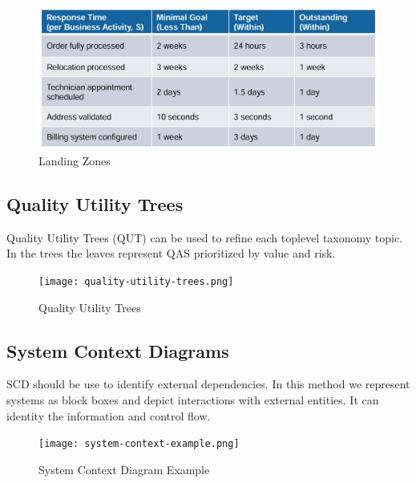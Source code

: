 \documentclass[../Main.tex]{subfiles}
\begin{document}
\begin{figure}[H]
    \centering
    \includegraphics[width=1\linewidth]{Images/landingzone.png}
    \caption{Landing Zones}
\end{figure}

\subsection{Quality Utility Trees}
Quality Utility Trees (QUT) can be used to refine
each toplevel taxonomy topic. In the trees the leaves
represent QAS prioritized by value and risk.

\begin{figure}[H]
    \centering
    \texttt{[image: quality-utility-trees.png]}
    \caption{Quality Utility Trees}
\end{figure}

\subsection{System Context Diagrams}
SCD should be use to identify external dependencies.
In this method we represent systems as block boxes and
depict interactions with external entities.
It can identity the information and control flow.

\begin{figure}[H]
    \centering
    \texttt{[image: system-context-example.png]}
    \caption{System Context Diagram Example}
\end{figure}

\newpage
\end{document}
